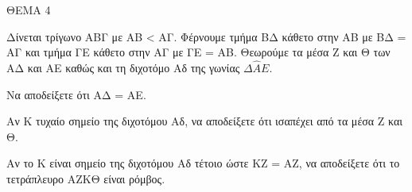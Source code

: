 
ΘΕΜΑ 4

Δίνεται τρίγωνο ΑΒΓ με ΑΒ \textless{} ΑΓ. Φέρνουμε τμήμα ΒΔ κάθετο στην ΑΒ με ΒΔ = ΑΓ και τμήμα ΓΕ κάθετο στην ΑΓ με ΓΕ = ΑΒ. Θεωρούμε τα μέσα Ζ και Θ των ΑΔ και ΑΕ καθώς και τη διχοτόμο Αδ της γωνίας $\Delta\widehat{Α}Ε$.

\begin{alist}
\item Να αποδείξετε ότι ΑΔ = ΑΕ. 

\item Αν Κ τυχαίο σημείο της διχοτόμου Αδ, να αποδείξετε ότι ισαπέχει από τα μέσα Ζ και Θ. 

\item Αν το Κ είναι σημείο της διχοτόμου Αδ τέτοιο ώστε ΚΖ = ΑΖ, να αποδείξετε ότι το τετράπλευρο ΑΖΚΘ είναι ρόμβος. 


\end{alist}

